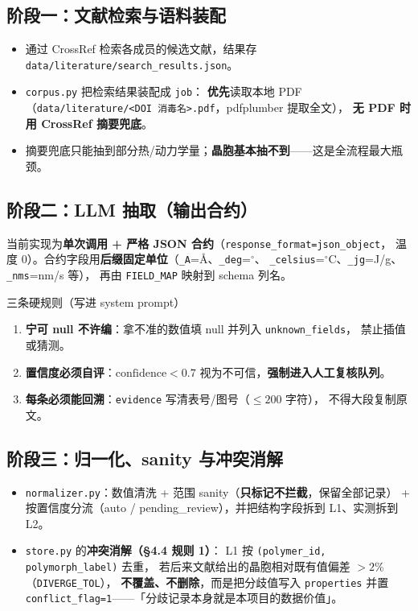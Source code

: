 \documentclass[11pt,a4paper]{ctexart}
\begin{document}
\subsection{阶段一：文献检索与语料装配}
\begin{itemize}[leftmargin=1.2em]
  \item 通过 CrossRef 检索各成员的候选文献，结果存 \texttt{data/literature/search\_results.json}。
  \item \texttt{corpus.py} 把检索结果装配成 \texttt{job}：
        \textbf{优先}读取本地 PDF（\texttt{data/literature/<DOI 消毒名>.pdf}，pdfplumber 提取全文），
        \textbf{无 PDF 时用 CrossRef 摘要兜底}。
  \item 摘要兜底只能抽到部分热/动力学量；\textbf{晶胞基本抽不到}——这是全流程最大瓶颈。
\end{itemize}

\subsection{阶段二：LLM 抽取（输出合约）}
当前实现为\textbf{单次调用 + 严格 JSON 合约}（\texttt{response\_format=json\_object}，
温度 0）。合约字段用\textbf{后缀固定单位}（\texttt{\_A}=\AA{}、\texttt{\_deg}=$^\circ$、
\texttt{\_celsius}=$^\circ$C、\texttt{\_jg}=J/g、\texttt{\_nms}=nm/s 等），
再由 \texttt{FIELD\_MAP} 映射到 schema 列名。

\begin{warnbox}{三条硬规则（写进 system prompt）}
\begin{enumerate}[leftmargin=1.6em]
  \item \textbf{宁可 null 不许编}：拿不准的数值填 null 并列入 \texttt{unknown\_fields}，
        禁止插值或猜测。
  \item \textbf{置信度必须自评}：$\text{confidence}<0.7$ 视为不可信，\textbf{强制进入人工复核队列}。
  \item \textbf{每条必须能回溯}：\texttt{evidence} 写清表号/图号（$\le 200$ 字符），
        不得大段复制原文。
\end{enumerate}
\end{warnbox}

\subsection{阶段三：归一化、sanity 与冲突消解}
\begin{itemize}[leftmargin=1.2em]
  \item \texttt{normalizer.py}：数值清洗 + 范围 sanity（\textbf{只标记不拦截}，保留全部记录）
        + 按置信度分流（auto / pending\_review），并把结构字段拆到 L1、实测拆到 L2。
  \item \texttt{store.py} 的\textbf{冲突消解（\S 4.4 规则 1）}：
        L1 按 \texttt{(polymer\_id, polymorph\_label)} 去重，
        若后来文献给出的晶胞相对既有值偏差 $>2\%$（\texttt{DIVERGE\_TOL}），
        \textbf{不覆盖、不删除}，而是把分歧值写入 \texttt{properties} 并置
        \texttt{conflict\_flag=1}——「分歧记录本身就是本项目的数据价值」。
\end{itemize}
\end{document}
